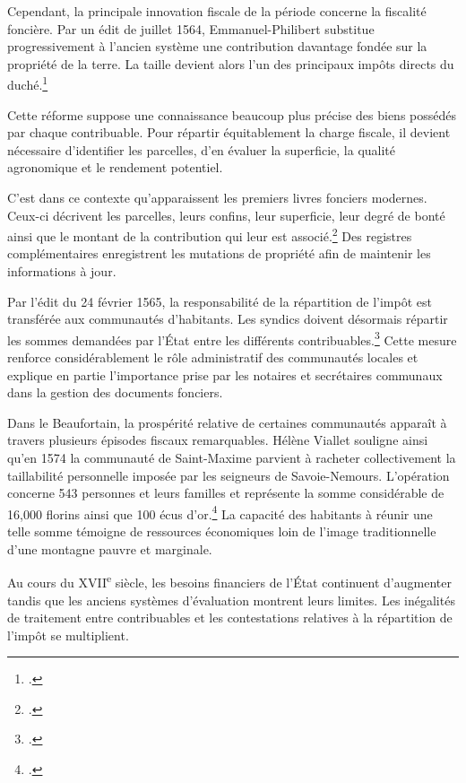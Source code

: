 \documentclass[12pt,a4paper]{report}
\begin{document}
Cependant, la principale innovation fiscale de la période concerne la fiscalité foncière. Par un édit de juillet 1564, Emmanuel-Philibert substitue progressivement à l'ancien système une contribution davantage fondée sur la propriété de la terre. La taille devient alors l'un des principaux impôts directs du duché.\footcite[272]{HVialletSel}

Cette réforme suppose une connaissance beaucoup plus précise des biens possédés par chaque contribuable. Pour répartir équitablement la charge fiscale, il devient nécessaire d'identifier les parcelles, d'en évaluer la superficie, la qualité agronomique et le rendement potentiel.

C'est dans ce contexte qu'apparaissent les premiers livres fonciers modernes. Ceux-ci décrivent les parcelles, leurs confins, leur superficie, leur degré de bonté ainsi que le montant de la contribution qui leur est associé.\footcite[272]{HVialletSel} Des registres complémentaires enregistrent les mutations de propriété afin de maintenir les informations à jour.

Par l'édit du 24 février 1565, la responsabilité de la répartition de l'impôt est transférée aux communautés d'habitants. Les syndics doivent désormais répartir les sommes demandées par l'État entre les différents contribuables.\footcite[272]{HVialletSel} Cette mesure renforce considérablement le rôle administratif des communautés locales et explique en partie l'importance prise par les notaires et secrétaires communaux dans la gestion des documents fonciers.

Dans le Beaufortain, la prospérité relative de certaines communautés apparaît à travers plusieurs épisodes fiscaux remarquables. Hélène Viallet souligne ainsi qu'en 1574 la communauté de Saint-Maxime parvient à racheter collectivement la taillabilité personnelle imposée par les seigneurs de Savoie-Nemours. L'opération concerne 543 personnes et leurs familles et représente la somme considérable de 16,000 florins ainsi que 100 écus d'or.\footcite[32]{HViallet1993} La capacité des habitants à réunir une telle somme témoigne de ressources économiques loin de l'image traditionnelle d'une montagne pauvre et marginale.

Au cours du XVII\textsuperscript{e} siècle, les besoins financiers de l'État continuent d'augmenter tandis que les anciens systèmes d'évaluation montrent leurs limites. Les inégalités de traitement entre contribuables et les contestations relatives à la répartition de l'impôt se multiplient.
\end{document}
